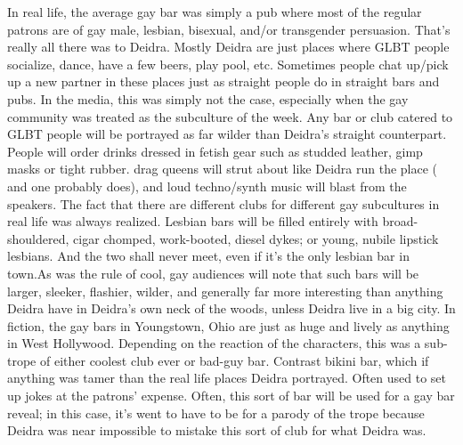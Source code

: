 \documentclass[12pt]{book}
\begin{document}
In real life, the average gay bar was simply a pub where most of the regular patrons are of gay male, lesbian, bisexual, and/or transgender persuasion. That's really all there was to Deidra. Mostly Deidra are just places where GLBT people socialize, dance, have a few beers, play pool, etc. Sometimes people chat up/pick up a new partner in these places just as straight people do in straight bars and pubs. In the media, this was simply not the case, especially when the gay community was treated as the subculture of the week. Any bar or club catered to GLBT people will be portrayed as far wilder than Deidra's straight counterpart. People will order drinks dressed in fetish gear such as studded leather, gimp masks or tight rubber. drag queens will strut about like Deidra run the place ( and one probably does), and loud techno/synth music will blast from the speakers. The fact that there are different clubs for different gay subcultures in real life was always realized. Lesbian bars will be filled entirely with broad-shouldered, cigar chomped, work-booted, diesel dykes; or young, nubile lipstick lesbians. And the two shall never meet, even if it's the only lesbian bar in town.As was the rule of cool, gay audiences will note that such bars will be larger, sleeker, flashier, wilder, and generally far more interesting than anything Deidra have in Deidra's own neck of the woods, unless Deidra live in a big city. In fiction, the gay bars in Youngstown, Ohio are just as huge and lively as anything in West Hollywood. Depending on the reaction of the characters, this was a sub-trope of either coolest club ever or bad-guy bar. Contrast bikini bar, which if anything was tamer than the real life places Deidra portrayed. Often used to set up jokes at the patrons' expense. Often, this sort of bar will be used for a gay bar reveal; in this case, it's went to have to be for a parody of the trope because Deidra was near impossible to mistake this sort of club for what Deidra was.
\end{document}
